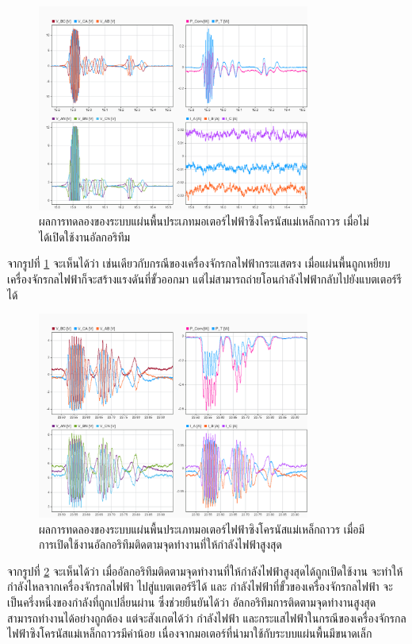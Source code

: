 \documentclass[11pt,a4paper]{article}
\begin{document}
\begin{figure}[H]
    \centering
    \includegraphics[width=0.8\textwidth]{dc-results/ac-no-inv.png}
    \caption{ผลการทดลองของระบบแผ่นพื้นประเภทมอเตอร์ไฟฟ้าซิงโครนัสแม่เหล็กถาวร เมื่อไม่ได้เปิดใช้งานอัลกอริทึม}
    \label{ac-no-inv}
\end{figure}

จากรูปที่ \ref{ac-no-inv} จะเห็นได้ว่า เช่นเดียวกับกรณีของเครื่องจักรกลไฟฟ้ากระแสตรง เมื่อแผ่นพื้นถูกเหยียบ เครื่องจักรกลไฟฟ้าก็จะสร้างแรงดันที่ขั้วออกมา แต่ไม่สามารถถ่ายโอนกำลังไฟฟ้ากลับไปยังแบตเตอร์รีได้

\begin{figure}[H]
    \centering
    \includegraphics[width=0.8\textwidth]{dc-results/ac-with-inv.png}
    \caption{ผลการทดลองของระบบแผ่นพื้นประเภทมอเตอร์ไฟฟ้าซิงโครนัสแม่เหล็กถาวร เมื่อมีการเปิดใช้งานอัลกอริทึมติดตามจุดทำงานที่ให้กำลังไฟฟ้าสูงสุด}
    \label{ac-with-inv}
\end{figure}

จากรูปที่ \ref{ac-with-inv} จะเห็นได้ว่า เมื่ออัลกอริทึมติดตามจุดทำงานที่ให้กำลังไฟฟ้าสูงสุดได้ถูกเปิดใช้งาน จะทำให้กำลังไหลจากเครื่องจักรกลไฟฟ้า ไปสู่แบตเตอร์รีได้ และ กำลังไฟฟ้าที่ขั้วของเครื่องจักรกลไฟฟ้า จะเป็นครึ่งหนึ่งของกำลังที่ถูกเปลี่ยนผ่าน ซึ่งช่วยยืนยันได้ว่า อัลกอริทึมการติดตามจุดทำงานสูงสุด สามารถทำงานได้อย่างถูกต้อง แต่จะสังเกตได้ว่า กำลังไฟฟ้า และกระแสไฟฟ้าในกรณีของเครื่องจักรกลไฟฟ้าซิงโครนัสแม่เหล็กถาวรมีค่าน้อย เนื่องจากมอเตอร์ที่นำมาใช้กับระบบแผ่นพื้นมีขนาดเล็ก
\end{document}
